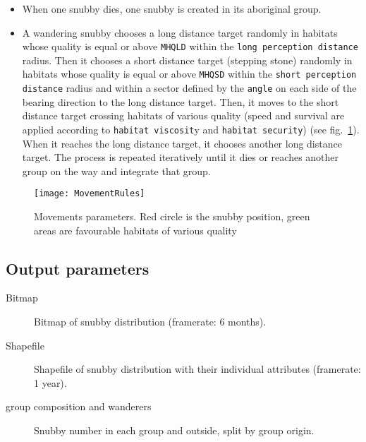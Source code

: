 \begin{itemize}
	\item When one snubby dies, one snubby is created in its aboriginal group.
	\item A wandering snubby chooses a long distance target randomly in habitats whose quality is equal or above \texttt{MHQLD} within the \texttt{long perception distance} radius. Then it chooses a short distance target (stepping stone) randomly in habitats whose quality is equal or above \texttt{MHQSD}  within the \texttt{short perception distance} radius and within a sector defined by the \texttt{angle} on each side of the bearing direction to the long distance target. Then, it moves to the short distance target crossing habitats of various quality (speed and survival are applied according to \texttt{habitat viscosit}y and \texttt{habitat security}) (see fig.~\ref{fig:movementrules}). When it reaches the long distance target, it chooses another long distance target. The process is repeated iteratively until it dies or reaches another group on the way and integrate that group.
\end{itemize}

 \begin{figure}[ht]
	\centering
	\texttt{[image: MovementRules]}
	\caption{Movements parameters. Red circle is the snubby position, green areas are favourable habitats of various quality}
	\label{fig:movementrules}
\end{figure}



\subsection{Output parameters}

\begin{description}
	\item[Bitmap] Bitmap of snubby distribution (framerate: 6 months).
	\item[Shapefile] Shapefile of snubby distribution with their individual attributes (framerate: 1 year).
	\item[group composition and wanderers] Snubby number in each group and outside, split by group origin.
	
\end{description}





